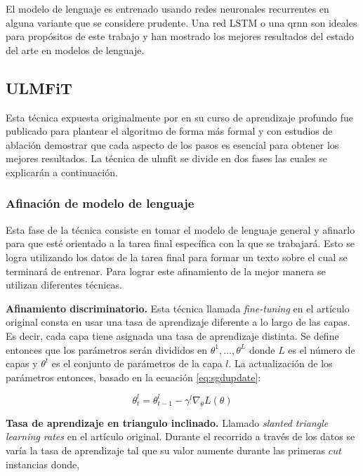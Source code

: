 El modelo de lenguaje es entrenado usando redes neuronales recurrentes en alguna variante que se considere prudente. Una red LSTM o una \gls{qrnn} \parencite{bradbury2016} son ideales para propósitos de este trabajo y han mostrado los mejores resultados del estado del arte en modelos de lenguaje.

\subsection{ULMFiT}

Esta técnica expuesta originalmente por \textcite{howard2018} en su curso de aprendizaje profundo fue publicado para plantear el algoritmo de forma más formal y con estudios de ablación demostrar que cada aspecto de los pasos es esencial para obtener los mejores resultados. La técnica de \gls{ulmfit} se divide en dos fases \parencite{howard2018} las cuales se explicarán a continuación.

\subsubsection{Afinación de modelo de lenguaje}
\label{lmftune}

Esta fase de la técnica consiste en tomar el modelo de lenguaje general y afinarlo para que esté orientado a la tarea final específica con la que se trabajará. Esto se logra utilizando los datos de la tarea final para formar un texto sobre el cual se terminará de entrenar. Para lograr este afinamiento de la mejor manera se utilizan diferentes técnicas.

\textbf{Afinamiento discriminatorio.} Esta técnica llamada \textit{fine-tuning} en el artículo original consta en usar una tasa de aprendizaje diferente a lo largo de las capas. Es decir, cada capa tiene asignada una tasa de aprendizaje distinta. Se define entonces que los parámetros serán divididos en ${\theta^1, \ldots, \theta^L}$ donde $L$ es el número de capas y $\theta^t$ es el conjunto de parámetros de la capa $l$. La actualización de los parámetros entonces, basado en la ecuación \ref{eq:sgdupdate}:

\begin{equation}
\label{eq:discupdate}
\theta_t^l = \theta_{t-1}^l - \gamma^l \nabla_{\theta} L(\theta)
\end{equation}

\textbf{Tasa de aprendizaje en triangulo inclinado.} Llamado \emph{slanted triangle learning rates} en el artículo original. Durante el recorrido a través de los datos se varía la tasa de aprendizaje tal que su valor aumente durante las primeras $cut$ instancias donde,

